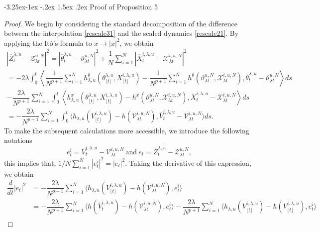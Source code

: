 \documentclass[a4paper, 10pt]{article}
\makeatletter
\theoremstyle{plain}%
\renewcommand\subsubsection{\@startsection{subsubsection}{3}{\z@}%
  {-3.25ex\@plus -1ex \@minus -.2ex}%
  {1.5ex \@plus .2ex}%
  {\normalfont\small\itshape\mdseries}}
\makeatother
\begin{document}
\subsubsection{Proof of Proposition 5}\label{Proof5}
\begin{proof}
    \noindent We begin by considering the standard decomposition of the difference between the interpolation \eqref{rescale31} and the scaled dynamics \eqref{rescale21}. By applying the It\^{o}'s formula to $x\to |x|^2$, we obtain
\begin{gather*}
|\overline{Z}^{\lambda,u}_t-{\mathcal{Z}}_{\lambda t}^{u,N}|^2=|\overline{\theta}^{\lambda,u}_t-{\vartheta}_{\lambda t}^{u,N}|^2+\dfrac{1}{N}\sum_{i=1}^N|\overline{X}^{i,\lambda,u}_t-\mathcal{X}_{\lambda t}^{i,u,N}|^2\\
=-2\lambda\int_0^t\left\langle \dfrac{1}{N^{p+1}}\sum_{i=1}^N h^{\theta}_{\lambda,u}(\theta_{\lfloor{t}\rfloor}^{\lambda,u},X^{i,\lambda,u}_{\lfloor{t}\rfloor})-\dfrac{1}{N^{p+1}}\sum_{i=1}^Nh^{\theta}({\vartheta}_{\lambda t}^{u,N},\mathcal{X}_{\lambda t}^{i,u,N}),\overline{{\theta}}_{t}^{\lambda,u}-{\vartheta}_{\lambda t}^{u,N}\right\rangle ds\\
-\dfrac{2\lambda}{N^{p+1}}\sum_{i=1}^N\int_0^t\left\langle h^{x}_{\lambda,u}(\theta_{\lfloor{t}\rfloor}^{\lambda,u},X^{i,\lambda,u}_{\lfloor{t}\rfloor})-h^{x}({\vartheta}_{\lambda t}^{u,N},\mathcal{X}_{\lambda t}^{i,u,N}), \overline{X}_{t}^{i,\lambda,u}-\mathcal{X}_{\lambda t}^{i,u,N}\right\rangle ds\\
=-\dfrac{2\lambda}{N^{p+1}}\sum_{i=1}^N\int_0^t \langle h_{\lambda,u}(V_{\lfloor{t}\rfloor}^{i,\lambda,u})-h(\mathcal{V}_{\lambda t}^{i,u,N}) , \overline{V}_{t}^{i,\lambda,u}-\mathcal{V}_{\lambda t}^{i,u,N}\rangle ds.
\end{gather*}
To make the subsequent calculations more accessible, we introduce the following notations
$$e^i_t=\overline{V}_{t}^{i,\lambda,u}-\mathcal{V}_{\lambda t}^{i,u,N}\ \text{and}\ e_t=\overline{Z}^{\lambda,u}_t-\mathcal{Z}_{\lambda t}^{u,N},$$ this implies that, $1/N\sum_{i=1}^N |e^i_t|^2=|e_t|^2.$ Taking the derivative of this expression, we obtain
\begin{align}
\dfrac{d}{dt}|e_t|^2&=-\dfrac{2\lambda}{N^{p+1}}\sum_{i=1}^N\langle  h_{\lambda,u}(V_{\lfloor{t}\rfloor}^{i,\lambda,u})-h(\mathcal{V}_{\lambda t}^{i,u,N}), e_t^i\rangle\nonumber\\
&=-\dfrac{2\lambda}{N^{p+1}}\sum_{i=1}^N\langle  h(\overline{V}_{t}^{i,\lambda,u})-h(\mathcal{V}_{\lambda t}^{i,u,N}), e_t^i\rangle-\dfrac{2\lambda}{N^{p+1}}\sum_{i=1}^N\langle  h_{\lambda,u}(V_{\lfloor{t}\rfloor}^{i,\lambda,u})-h(V_{\lfloor{t}\rfloor}^{i,\lambda,u}), e_t^i\rangle\nonumber\\

\end{align}
\end{proof}
\end{document}
